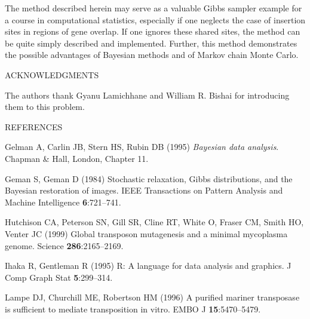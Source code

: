 \documentclass[letterpaper]{article}
\newenvironment{hanging}
{\begin{list}{}
        {\setlength{\labelwidth}{0in}
         \setlength{\leftmargin}{2em}
         \setlength{\itemindent}{-2em}
         \setlength{\parsep}{0in}
         \setlength{\itemsep}{0in}
        }
}
{\end{list}}
\begin{document}
\begin{multicols}{2}
The method described herein may serve as a valuable Gibbs sampler
example for a course in computational statistics, especially if one
neglects the case of insertion sites in regions of gene overlap.  If
one ignores these shared sites, the method can be quite simply
described and implemented.  Further, this method demonstrates the
possible advantages of Bayesian methods and of Markov chain Monte
Carlo.


\smallskip \bigskip
\centerline{ACKNOWLEDGMENTS}
\smallskip

The authors thank Gyanu Lamichhane and William R. Bishai for
introducing them to this problem.


\smallskip \bigskip
\centerline{REFERENCES}

\begin{hanging}
\item Gelman A, Carlin JB, Stern HS, Rubin DB (1995) \emph{Bayesian
data analysis}.  Chapman \& Hall, London, Chapter 11.

\item Geman S, Geman D (1984) Stochastic relaxation, Gibbs
distributions, and the Bayesian restoration of images.  IEEE
Transactions on Pattern Analysis and Machine Intelligence
\textbf{6}:721--741.  

\item Hutchison CA, Peterson SN, Gill SR, Cline RT, White O, Fraser
CM, Smith HO, Venter JC (1999) Global transposon mutagenesis and a
minimal mycoplasma genome.  Science \textbf{286}:2165--2169.

\item Ihaka R, Gentleman R (1995) R: A language for data analysis and
graphics.  J Comp Graph Stat \textbf{5}:299--314.

\item Lampe DJ, Churchill ME, Robertson HM (1996) A purified mariner
transposase is sufficient to mediate transposition in vitro.  EMBO J
\textbf{15}:5470--5479. 

\end{hanging}

\end{multicols}
\end{document}
